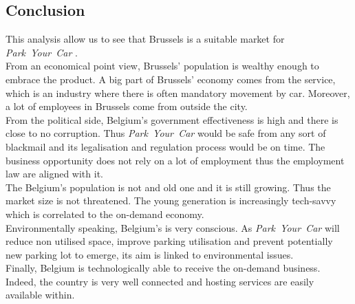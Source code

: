 \documentclass[12pt,a4paper,oneside]{book}
\newcommand{\bp}{\textit{Park~Your~Car }}
\begin{document}
\subsection{Conclusion}
This analysis allow us to see that Brussels is a suitable market for \bp.\\
From an economical point view, Brussels' population is wealthy enough to embrace the product. A big part of Brussels' economy comes from the service, which is an industry where there is often mandatory movement by car. Moreover, a lot of employees in Brussels come from outside the city.\\
From the political side, Belgium's government effectiveness is high and there is close to no corruption. Thus \bp would be safe from any sort of blackmail and its legalisation and regulation process would be on time. The business opportunity does not rely on a lot of employment thus the employment law are aligned with it.\\
The Belgium's population is not and old one and it is still growing. Thus the market size is not threatened. The young generation is increasingly tech-savvy which is correlated to the on-demand economy.\\
Environmentally speaking, Belgium's is very conscious. As \bp will reduce non utilised space, improve parking utilisation and prevent potentially new parking lot to emerge, its aim is linked to environmental issues.\\
Finally, Belgium is technologically able to receive the on-demand business. Indeed, the country is very well connected and hosting services are easily available within.
\end{document}
